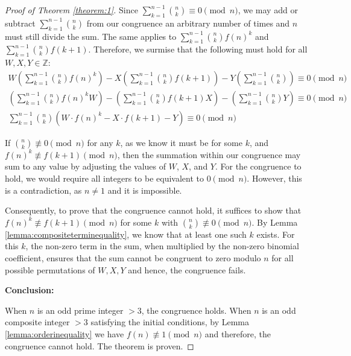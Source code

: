 \documentclass{article}
\theoremstyle{plain}
\theoremstyle{definition}
\begin{document}
\begin{proof}[Proof of Theorem \ref{theorem:1}]
Since $\sum_{k=1}^{n-1} \binom{n}{k} \equiv 0 \pmod{n}$, we may add or subtract $\sum_{k=1}^{n-1} \binom{n}{k}$ from our congruence an arbitrary number of times and $n$ must still divide the sum. The same applies to $\sum_{k=1}^{n-1} \binom{n}{k} f(n)^k$ and $\sum_{k=1}^{n-1} \binom{n}{k} f(k+1)$. Therefore, we surmise that the following must hold for all $W,X,Y \in \mathbb{Z}$:
\begin{align}
W \left(\sum_{k=1}^{n-1} \binom{n}{k} f(n)^k\right) - X \left(\sum_{k=1}^{n-1} \binom{n}{k} f(k+1)\right) - Y \left(\sum_{k=1}^{n-1} \binom{n}{k}\right) \equiv 0 \pmod{n} \\
\left(\sum_{k=1}^{n-1} \binom{n}{k} f(n)^k W\right) - \left(\sum_{k=1}^{n-1} \binom{n}{k} f(k+1) X\right) - \left(\sum_{k=1}^{n-1} \binom{n}{k} Y\right) \equiv 0 \pmod{n} \\
\sum_{k=1}^{n-1} \binom{n}{k} \left( W \cdot f(n)^k - X \cdot f(k+1) - Y\right) \equiv 0 \pmod{n}
\end{align}

If $\binom{n}{k} \not\equiv 0 \pmod{n}$ for any $k$, as we know it must be for some $k$, and $f(n)^k \not\equiv f(k+1) \pmod{n}$, then the summation within our congruence may sum to any value by adjusting the values of $W$, $X$, and $Y$. For the congruence to hold, we would require all integers to be equivalent to $0 \pmod{n}$. However, this is a contradiction, as $n\not=1$ and it is impossible.

Consequently, to prove that the congruence cannot hold, it suffices to show that $f(n)^k \not\equiv f(k+1) \pmod{n}$ for some $k$ with $\binom{n}{k} \not\equiv 0 \pmod{n}$. By Lemma \ref{lemma:compositeterminequality}, we know that at least one such $k$ exists. For this $k$, the non-zero term in the sum, when multiplied by the non-zero binomial coefficient, ensures that the sum cannot be congruent to zero modulo \( n \) for all possible permutations of $W, X, Y$ and hence, the congruence fails.

\textbf{Conclusion:}

When $n$ is an odd prime integer $>3$, the congruence holds. When $n$ is an odd composite integer $>3$ satisfying the initial conditions, by Lemma \ref{lemma:orderinequality} we have $f(n) \not\equiv 1 \pmod{n}$ and therefore, the congruence cannot hold. The theorem is proven.
\end{proof}
\end{document}
